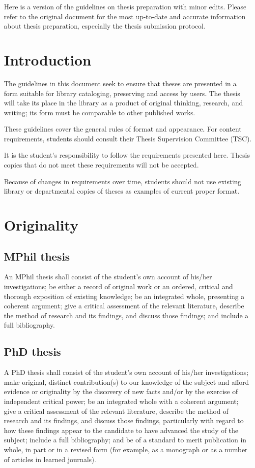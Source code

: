Here is a version of the guidelines on thesis preparation with minor edits. Please refer to the original document \citep{guidelines} for the most up-to-date and accurate information about thesis preparation, especially the thesis submission protocol.
\section{Introduction}
The guidelines in this document seek to ensure that theses are presented in a form suitable for library cataloging, preserving and access by users. The thesis will take its place in the library as a product of original thinking, research, and writing; its form must be comparable to other published works.

These guidelines cover the general rules of format and appearance. For content requirements, students should consult their Thesis Supervision Committee (TSC).

It is the student's responsibility to follow the requirements presented here. Thesis copies that do not meet these requirements will not be accepted.

Because of changes in requirements over time, students should not use existing library or departmental copies of theses as examples of current proper format.

\section{Originality}
\subsection{MPhil thesis}
An MPhil thesis shall consist of the student's own account of his/her investigations; be either a record of original work or an ordered, critical and thorough exposition of existing knowledge; be an integrated whole, presenting a coherent argument; give a critical assessment of the relevant literature, describe the method of research and its findings, and discuss those findings; and include a full bibliography.
\subsection{PhD thesis}
A PhD thesis shall consist of the student's own account of his/her investigations; make original, distinct contribution(s) to our knowledge of the subject and afford evidence or originality by the discovery of new facts and/or by the exercise of independent critical power; be an integrated whole with a coherent argument; give a critical assessment of the relevant literature, describe the method of research and its findings, and discuss those findings, particularly with regard to how these findings appear to the candidate to have advanced the study of the subject; include a full bibliography; and be of a standard to merit publication in whole, in part or in a revised form (for example, as a monograph or as a number of articles in learned journals).

